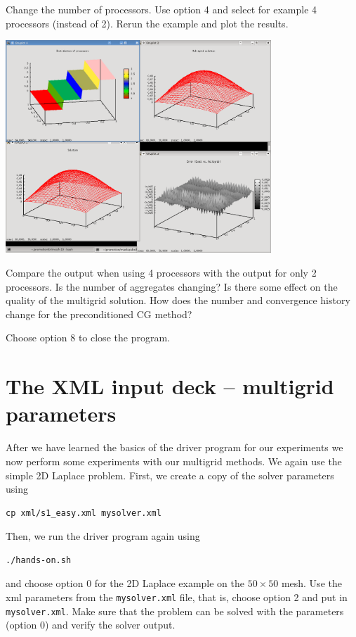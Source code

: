 \documentclass[10pt,fleqn]{book}
\begin{document}
\begin{exercise}
Change the number of processors. Use option 4 and select for example 4 processors (instead of 2). Rerun the example and plot the results.
\begin{center}\includegraphics[width=10cm]{pics/tut1_9.png} \end{center}
\end{exercise}
\begin{exercise}
Compare the output when using 4 processors with the output for only 2 processors. Is the number of aggregates changing? Is there some effect on the quality of the multigrid solution. How does the number and convergence history change for the preconditioned CG method?
\end{exercise}
\begin{exercise}
Choose option 8 to close the program.
\end{exercise}

\section{The XML input deck -- multigrid parameters}

After we have learned the basics of the driver program for our experiments we now perform some experiments with our multigrid methods. We again use the simple 2D Laplace problem. First, we create a copy of the solver parameters using
\begin{verbatim}
cp xml/s1_easy.xml mysolver.xml
\end{verbatim}
Then, we run the driver program again using
\begin{verbatim}
./hands-on.sh
\end{verbatim}
and choose option 0 for the 2D Laplace example on the $50\times 50$ mesh. Use the xml parameters from the \texttt{mysolver.xml} file, that is, choose option 2 and put in \texttt{mysolver.xml}. Make sure that the problem can be solved with the parameters (option 0) and verify the solver output.
\end{document}
